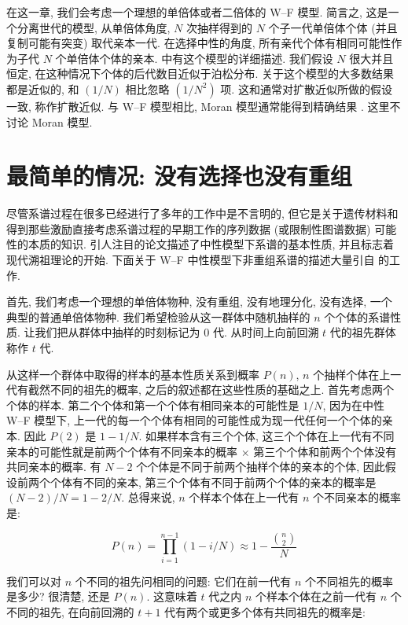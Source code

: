 \documentclass[12pt]{article}
\begin{document}
在这一章, 我们会考虑一个理想的单倍体或者二倍体的 W--F 模型. 简言之, 这是一个分离世代的模型, 从单倍体角度,
$N$ 次抽样得到的 $N$ 个子一代单倍体个体 (并且复制可能有突变) 取代亲本一代. 在选择中性的角度,
所有亲代个体有相同可能性作为子代 $N$ 个单倍体个体的亲本. \textcite{ewens2012mathematical} 中有这个模型的详细描述.
我们假设 $N$ 很大并且恒定, 在这种情况下个体的后代数目近似于泊松分布. 关于这个模型的大多数结果都是近似的, 和
$(1/N)$ 相比忽略 $(1/N^{2})$ 项. 这和通常对扩散近似所做的假设一致, 称作扩散近似. 与 W--F
模型相比, Moran 模型通常能得到精确结果 \parencite{watterson1975}. 这里不讨论
Moran 模型.

\section{最简单的情况: 没有选择也没有重组}

尽管系谱过程在很多已经进行了多年的工作中是不言明的,
但它是关于遗传材料和得到那些激励直接考虑系谱过程的早期工作的序列数据 (或限制性图谱数据) 可能性的本质的知识.
\textcite{watterson1975} 引人注目的论文描述了中性模型下系谱的基本性质, 并且标志着现代溯祖理论的开始.
下面关于 W--F 中性模型下非重组系谱的描述大量引自 \textcite{watterson1975, griffiths1980, tajima1983} 的工作.

首先, 我们考虑一个理想的单倍体物种, 没有重组, 没有地理分化, 没有选择, 一个典型的普通单倍体物种.
我们希望检验从这一群体中随机抽样的 $n$ 个个体的系谱性质. 让我们把从群体中抽样的时刻标记为 0 代.
从时间上向前回溯 $t$ 代的祖先群体称作 $t$ 代.

从这样一个群体中取得的样本的基本性质关系到概率 $P(n)$, $n$ 个抽样个体在上一代有截然不同的祖先的概率,
之后的叙述都在这些性质的基础之上. 首先考虑两个个体的样本. 第二个个体和第一个个体有相同亲本的可能性是 $1/N$,
因为在中性 W--F 模型下, 上一代的每一个个体有相同的可能性成为现一代任何一个个体的亲本. 因此 $P(2)$ 是
$1-1/N$. 如果样本含有三个个体, 这三个个体在上一代有不同亲本的可能性就是前两个个体有不同亲本的概率
$\times$ 第三个个体和前两个个体没有共同亲本的概率. 有 $N-2$ 个个体是不同于前两个抽样个体的亲本的个体,
因此假设前两个个体有不同的亲本, 第三个个体有不同于前两个个体的亲本的概率是 $(N-2)/N=1-2/N$.
总得来说, $n$ 个样本个体在上一代有 $n$ 个不同亲本的概率是:

\begin{equation} \label{eq:3}
    P(n) = \prod_{i=1}^{n-1}(1-i/N) \approx 1-\frac{\binom{n}{2}}{N}
\end{equation}

我们可以对 $n$ 个不同的祖先问相同的问题: 它们在前一代有 $n$ 个不同祖先的概率是多少? 很清楚, 还是 $P(n)$. 这意味着 $t$
代之内 $n$ 个样本个体在之前一代有 $n$ 个不同的祖先, 在向前回溯的 $t+1$ 代有两个或更多个体有共同祖先的概率是:
\end{document}
